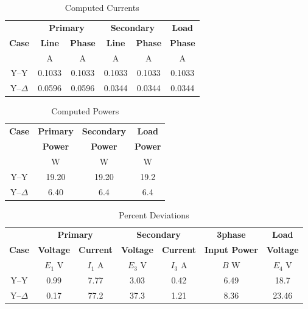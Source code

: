 \documentclass{article}
\begin{document}
\begin{table}[H]
  \centering
  \begin{tabular}{*{6}{c}}
    & \multicolumn{2}{c}{\textbf{Primary}}
    & \multicolumn{2}{c}{\textbf{Secondary}} & \textbf{Load} \\

    \textbf{Case} & \textbf{Line} & \textbf{Phase} & \textbf{Line} &
    \textbf{Phase} & \textbf{Phase} \\

    & A & A & A & A & A \\
    \hline

    Y--Y        & 0.1033 & 0.1033 & 0.1033 & 0.1033 & 0.1033 \\
    Y--$\Delta$ & 0.0596 & 0.0596 & 0.0344 & 0.0344 & 0.0344 \\
  \end{tabular}
  \caption{Computed Currents}
  \label{tab:curr_comp}
\end{table}

\begin{table}[H]
  \centering
  \begin{tabular}{*{4}{c}}
    \textbf{Case} & \textbf{Primary} & \textbf{Secondary} & \textbf{Load} \\

    & \textbf{Power} & \textbf{Power} & \textbf{Power} \\

    & W & W & W \\
    \hline

    Y--Y        & 19.20 & 19.20 & 19.2 \\
    Y--$\Delta$ & 6.40 & 6.4 & 6.4 \\
  \end{tabular}
  \caption{Computed Powers}
  \label{tab:pow_comp}
\end{table}

\begin{table}[H]
  \centering
  \begin{tabular}{*{7}{c}}
    & \multicolumn{2}{c}{\textbf{Primary}} &
    \multicolumn{2}{c}{\textbf{Secondary}} & \textbf{3phase} & \textbf{Load} \\

    \textbf{Case} & \textbf{Voltage} & \textbf{Current} & \textbf{Voltage} &
    \textbf{Current} & \textbf{Input Power} & \textbf{Voltage} \\

    & $E_1$ V & $I_1$ A & $E_3$ V & $I_3$ A & $B$ W & $E_4$ V \\

    \hline
    Y--Y        & 0.99 & 7.77 & 3.03 & 0.42 & 6.49 & 18.7 \\
    Y--$\Delta$ & 0.17 & 77.2 & 37.3 & 1.21 & 8.36 & 23.46 \\
  \end{tabular}
  \caption{Percent Deviations}
  \label{tab:results}
\end{table}
\end{document}
